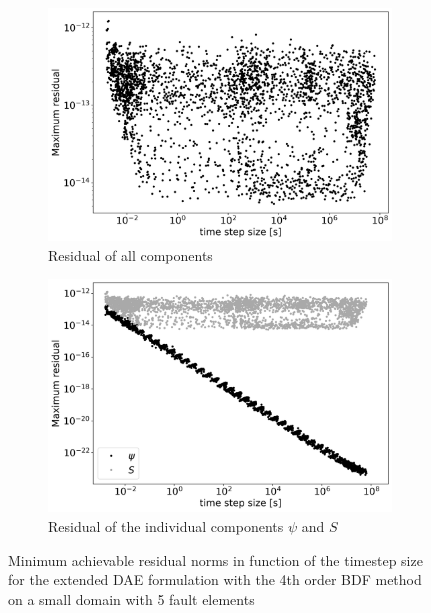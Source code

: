 \begin{figure}[H]
	\centering
	\begin{subfigure}[t]{0.45\textwidth}
	\centering
		\includegraphics[width=1\textwidth]{images/TANDEMConvergenceAnalysisExtendedDAEMaxResidual_Size5.png}
		\caption{Residual of all components}
		\label{fig:convergenceIssuesExtendedDAEMaxResidual_vs_dt}
	\end{subfigure} 
	\begin{subfigure}[t]{0.45\textwidth}
		\centering
		\includegraphics[width=1\textwidth]{images/TANDEMConvergenceAnalysisExtendedDAEMaxResidual_Size5_onlyPSI.png}
		\caption{Residual of the individual components $\psi$ and $S$}
		\label{fig:convergenceIssuesExtendedDAEMaxResidual_vs_dt_onlyPSI}
	\end{subfigure} 
	\caption{Minimum achievable residual norms in function of the timestep size for the extended DAE formulation with the 4th order BDF method on a small domain with 5 fault elements}
\end{figure}

